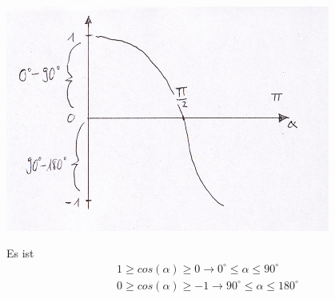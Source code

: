 \begin{center}
	\includegraphics[width=0.8\textwidth]{imgs/CosinusKurve.png}
\end{center}
Es ist
\begin{eqnarray*}
	1 \ge cos(\alpha) \ge 0 \to 0^\circ \le \alpha \le 90^\circ\\
	0 \ge cos(\alpha) \ge -1 \to 90^\circ \le \alpha \le 180^\circ\\
\end{eqnarray*}
